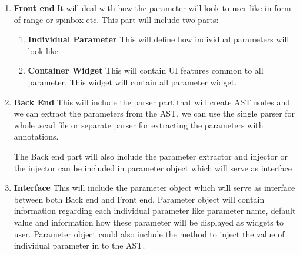 \begin{enumerate}
	\item \textbf{Front end}
	It will deal with how the parameter will look to user like in form of range or spinbox etc. This part will include two parts:
	\begin{enumerate}
		\item \textbf{Individual Parameter}
		This will define how individual parameters will look like
		\item \textbf{Container Widget}
		This will contain UI features common to all parameter. This widget will contain all parameter widget. 
		
	\end{enumerate}
	
	\item \textbf{Back End}
	This will include the parser part that will create AST nodes and we can extract the parameters from the AST. we can use the single parser for whole .scad file or separate parser for extracting the parameters with annotations.
	
	The Back end part will also include the parameter extractor and injector or the injector can be included in parameter object which will serve as interface 
	\item \textbf{Interface}
	This will include the parameter object which will serve as interface between both Back end and Front end. Parameter object will contain information regarding each individual parameter like parameter name, default value and information how these parameter will be displayed as widgets to user. Parameter object could also include the method to inject the value of individual parameter in to the AST. 
	
\end{enumerate}

